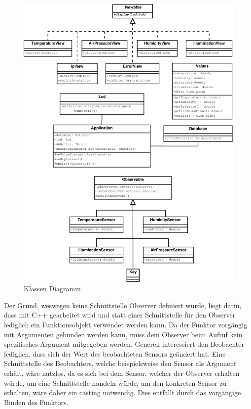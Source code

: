 \documentclass[
    10pt,
    a4paper,
]{scrartcl}
\begin{document}
\begin{figure}[ht]
    \centering
    \includegraphics[width=\textwidth]{class-diagram}
    \caption{Klassen Diagramm}
    \label{fig:class-diagram}
\end{figure}

Der Grund, weswegen keine Schnittstelle Observer definiert wurde, liegt darin, dass mit
C++ gearbeitet wird und statt einer Schnittstelle für den Observer lediglich ein
Funktionsobjekt verwendet werden kann. Da der Funktor vorgängig mit Argumenten gebunden
werden kann, muss dem Observer beim Aufruf kein spezifisches Argument mitgegeben werden.
Generell interessiert den Beobachter lediglich, dass sich der Wert des beobachteten
Sensors geändert hat. Eine Schnittstelle des Beobachters, welche beispielsweise den Sensor
als Argument erhält, wäre nutzlos, da es sich bei dem Sensor, welcher der Observer
erhalten würde, um eine Schnittstelle handeln würde, um den konkreten Sensor zu erhalten,
wäre daher ein casting notwendig. Dies entfällt durch das vorgängige Binden des Funktors.
\end{document}
